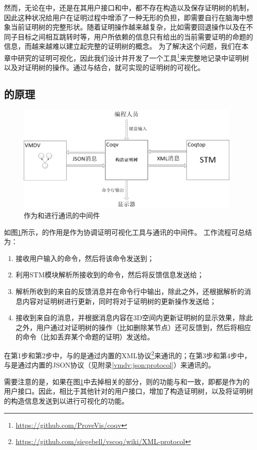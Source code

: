 然而，无论在中，还是在其用户接口和中，都不存在构造以及保存证明树的机制，因此这种状况给用户在证明过程中增添了一种无形的负担，即需要自行在脑海中想象当前证明树的完整形状。随着证明操作越来越复杂，比如需要回退操作以及在不同子目标之间相互跳转时等，用户所依赖的信息只有给出的当前需要证明的命题的信息，而越来越难以建立起完整的证明树的概念。
为了解决这个问题，我们在本章中研究的证明可视化，因此我们设计并开发了一个工具\footnote{\url{https://github.com/ProveVis/coqv}}来完整地记录中证明树以及对证明树的操作。通过与结合，就可实现的证明树的可视化。

\subsection{的原理}
\begin{figure}[h!]
	\centering
	\includegraphics[width=11cm]{Img/coqv_overview.png}
	\caption{作为和进行通讯的中间件}
	\label{coqv:overview}
\end{figure}
如图\ref{coqv:overview}所示，的作用是作为协调证明可视化工具与通讯的中间件。
工作流程可总结为：
\begin{enumerate}
	\item {}接收用户输入的命令，然后将该命令发送到；
	\item {}利用STM模块解析所接收到的命令，然后将反馈信息发送给；
	\item {}解析所收到的来自的反馈消息并在命令行中输出，除此之外，还根据解析的消息内容对证明树进行更新，同时将对于证明树的更新操作发送给；
	\item {}接收到来自的消息，并根据消息内容在3D空间内更新证明树的显示效果，除此之外，用户通过对证明树的操作（比如删除某节点）还可反馈到，然后将相应的命令（比如丢弃某个命题的证明）发送给。
\end{enumerate}

在第1步和第2步中，与的是通过内置的XML协议\footnote{\url{https://github.com/siegebell/vscoq/wiki/XML-protocol}}来通讯的；在第3步和第4步中，与是通过内置的JSON协议（见附录\ref{vmdv:json:protocol}）来通讯的。

需要注意的是，如果在图\ref{coqv:overview}中去掉相关的部分，则的功能与和一致，即都是作为的用户接口。因此，相比于其他针对的用户接口，增加了构造证明树，以及将证明树的构造信息发送到以进行可视化的功能。

